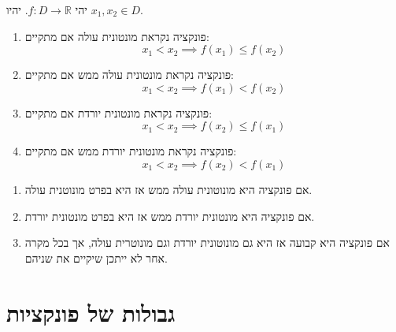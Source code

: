 \documentclass{tstextbook}
\begin{document}
\begin{definition}
יהי \(f:D\to\mathbb{R}\). יהיו \(x_{1},x_{2} \in D\).

  \begin{enumerate}
    \item פונקציה נקראת מונטונית עולה אם מתקיים: 
$$x_{1}< x_{2}\implies f(x_{1})\leq f(x_{2})$$


    \item פונקציה נקראת מונטונית עולה ממש אם מתקיים: 
$$x_{1}<x_{2}\implies f(x_{1})<f(x_{2})$$


    \item פונקציה נקראת מונטונית יורדת אם מתקיים: 
$$x_{1}<x_{2}\implies f(x_{2})\leq f(x_{1})$$


    \item פונקציה נקראת מונטונית יורדת ממש אם מתקיים: 
$$x_{1}<x_{2}\implies f(x_{2})<f(x_{1})$$


  \end{enumerate}
\end{definition}
\begin{corollary}
  \begin{enumerate}
    \item אם פונקציה היא מונוטונית עולה ממש אז היא בפרט מונוטנית עולה. 


    \item אם פונקציה היא מונטונית יורדת ממש אז היא בפרט מונטונית יורדת. 


    \item אם פונקציה היא קבועה אז היא גם מונוטונית יורדת וגם מונוטרית עולה, אך בכל מקרה אחר לא ייתכן שיקיים את שניהם. 


  \end{enumerate}
\end{corollary}
\section{גבולות של פונקציות}
\end{document}
